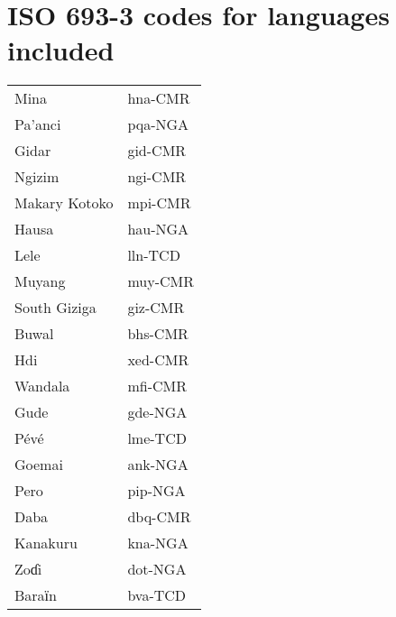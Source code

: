 \documentclass[output=paper]{langsci/langscibook}
\begin{document}
\section*{ISO 693-3 codes for languages included}
\begin{minipage}{\textwidth}
\begin{tabularx}{\textwidth}[h]{@{} l l @{}}
Mina		&hna-CMR\\
Pa'anci     	&pqa-NGA\\
Gidar       	&gid-CMR\\
Ngizim 		&ngi-CMR\\
Makary Kotoko  &mpi-CMR\\
Hausa 		&hau-NGA\\
Lele 		&lln-TCD\\
Muyang 		&muy-CMR\\
South Giziga	&giz-CMR\\
Buwal 		&bhs-CMR\\
Hdi			&xed-CMR\\
Wandala		&mfi-CMR\\
Gude		&gde-NGA\\
P\'ev\'e 		&lme-TCD\\
Goemai 		&ank-NGA\\
Pero 		&pip-NGA\\
Daba 		&dbq-CMR\\
Kanakuru 	&kna-NGA\\
Zoɗi 		&dot-NGA\\
Baraїn		&bva-TCD\\
\end{tabularx}\end{minipage}

\pagebreak
{\sloppy\printbibliography[heading=subbibliography,notkeyword=this]}
\end{document}
